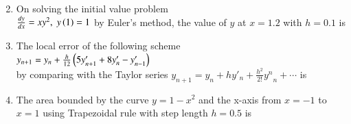 \documentclass[journal,,12pt,onecolumn]{IEEEtran}
\theoremstyle{remark}
\begin{document}
\begin{enumerate}
\begin{enumerate}
\begin{multicols}{2}
        \end{multicols}
\end{enumerate}
\bigskip
\item On solving the initial value problem\\
$\frac{dy}{dx}=xy^2,\; y\left(1\right)=1$ by Euler's method, the value of $y$ at $x=1.2$ with $h=0.1$ is
\begin{enumerate}
\end{enumerate}
\bigskip
\item The local error of the following scheme\\
$y_{n+1}=y_n+\frac{h}{12}\left(5y'_{n+1}+8y'_{n}-y'_{n-1}\right)$\\
by comparing with the Taylor series $y_{n+1}=y_n+hy'_n+\frac{h^2}{2!}{y^n}_n+\cdots$ is
\begin{enumerate}
\end{enumerate}
\bigskip
\item The area bounded by the curve $y=1-x^2$ and the x-axis from $x=-1$ to $x=1$ using Trapezoidal rule with step length $h=0.5$ is
\begin{enumerate}
\end{enumerate}
\bigskip

\end{enumerate}
\end{document}
